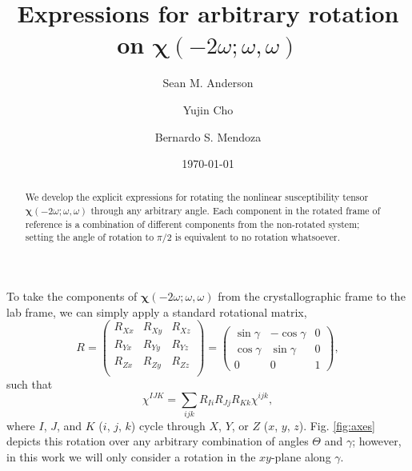 \documentclass[aps,prb,10pt,letterpaper,notitlepage]{revtex4-1}
\begin{document}
\title{Expressions for arbitrary rotation on
\texorpdfstring{$\boldsymbol{\chi}(-2\omega;\omega,\omega)$}{X(2w)}}
\author{Sean M. Anderson}
\author{Yujin Cho}
\author{Bernardo S. Mendoza}
\date{\today}

\begin{abstract}
We develop the explicit expressions for rotating the nonlinear susceptibility
tensor $\boldsymbol{\chi}(-2\omega;\omega,\omega)$ through any arbitrary angle.
Each component in the rotated frame of reference is a combination of different
components from the non-rotated system; setting the angle of rotation to $\pi/2$
is equivalent to no rotation whatsoever.
\end{abstract}

\maketitle

To take the components of $\boldsymbol{\chi}(-2\omega;\omega,\omega)$ from the
crystallographic frame to the lab frame, we can simply apply a standard
rotational matrix,
\begin{equation*}
R =
\begin{pmatrix}
R_{Xx} & R_{Xy} & R_{Xz} \\
R_{Yx} & R_{Yy} & R_{Yz} \\
R_{Zx} & R_{Zy} & R_{Zz} \\
\end{pmatrix}
=
\begin{pmatrix}
\sin\gamma & -\cos\gamma & 0 \\
\cos\gamma &  \sin\gamma & 0 \\
    0    &      0    & 1
\end{pmatrix},
\end{equation*}
such that
\begin{equation*}
\chi^{IJK} = \sum_{ijk}R_{Ii}R_{Jj}R_{Kk}\chi^{ijk},
\end{equation*}
where $I$, $J$, and $K$ ($i$, $j$, $k$) cycle through $X$, $Y$, or $Z$ ($x$,
$y$, $z$). Fig. \ref{fig:axes} depicts this rotation over any arbitrary
combination of angles $\Theta$ and $\gamma$; however, in this work we will only
consider a rotation in the $xy$-plane along $\gamma$.
\end{document}
